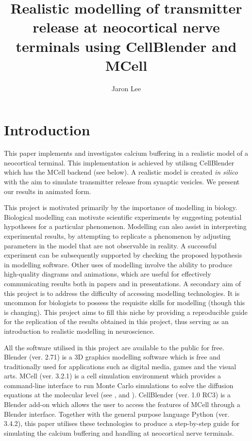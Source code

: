 \documentclass[a4paper]{article}
\title{Realistic modelling of transmitter release at neocortical nerve terminals using CellBlender and MCell}
\author{Jaron Lee}
\begin{document}
\maketitle

\section{Introduction}
This paper implements and investigates calcium buffering in a realistic model of a neocortical terminal. This implementation is achieved by utilisng CellBlender which has the MCell backend (see below).  A realistic model is created \textit{in silico} with the aim to simulate transmitter release from synaptic vesicles. We present our results in animated form. 

This project is motivated primarily by the importance of modelling in biology. Biological modelling can motivate scientific experiments by suggesting potential hypotheses for a particular phenomenon. Modelling can also assist in interpreting experimental results, by attempting to replicate a phenomenon by adjusting parameters in the model that are not observable in reality. A successful experiment can be subsequently supported by checking the proposed hypothesis in modelling software. Other uses of modelling involve the ability to produce high-quality diagrams and animations, which are useful for effectively communicating results both in papers and in presentations. A secondary aim of this project is to address the difficulty of accessing modelling technologies. It is uncommon for biologists to possess the requisite skills for modelling (though this is changing).
This project aims to fill this niche by providing a reproducible guide for the replication of the results obtained in this project, thus serving as an introduction to realistic modelling in neuroscience.

All the software utilised in this project are available to the public for free. Blender (ver. 2.71) is a 3D graphics modelling software which is free and traditionally used for applications such as digital media, games and the visual arts. MCell (ver. 3.2.1) is a cell simulation environment which provides a command-line interface to run Monte Carlo simulations to solve the diffusion equations at the molecular level (see \cite{stiles1996miniature}, \cite{stiles2001monte} and \cite{Kerr:SiamJSciComput:2008}). CellBlender (ver. 1.0 RC3) is a Blender add-on which allows the user to access the features of MCell through a Blender interface. Together with the general purpose language Python (ver. 3.4.2), this paper utilises these technologies to produce a step-by-step guide for simulating the calcium buffering and handling at neocortical nerve terminals.
\end{document}
